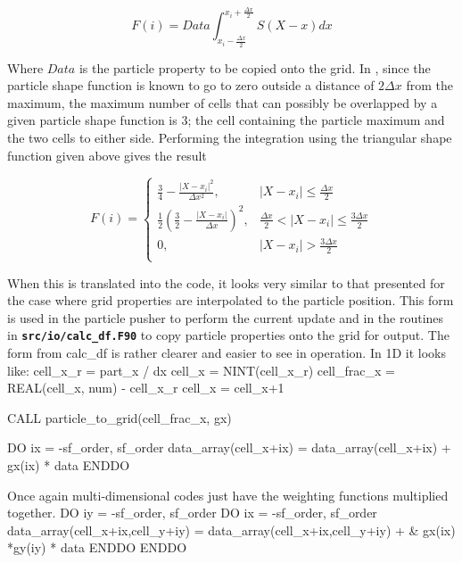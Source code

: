 \documentclass[12pt,a4paper]{article}
\newcommand{\inlinecode}[1]{{\color{warwickred} \bf\texttt{#1}}}
\newcommand{\EPOCH}{{\color{warwickdark}\fontfamily{phv}\selectfont{EPOCH}}}
\newenvironment{boxverbatim}{\lboxverbatim{none}}{\endlboxverbatim}
\begin{document}
\[
F(i) = Data  \int^{x_i+\frac{\Delta x}{2}}_{x_i-\frac{\Delta x}{2}} S(X-x) dx
\]

Where $Data$ is the particle property to be copied onto the grid. In {\EPOCH},
since the particle shape function is known to go to zero outside a distance of
$2 \Delta x$ from the maximum, the maximum number of cells that can possibly be
overlapped by a given particle shape function is 3; the cell containing the
particle maximum and the two cells to either side. Performing the integration
using the triangular shape function given above gives the result

\[
  F(i) =
\begin{cases}
  \frac{3}{4} - \frac{|X-x_i|^2}{\Delta x^2}, & |X-x_i|
    \le \frac{\Delta x}{2}\\
  \frac{1}{2} \left(\frac{3}{2}
    - \frac{|X - x_i|}{\Delta x} \right)^2, & \frac{\Delta x}{2} < |X-x_i|
    \le \frac{3 \Delta x}{2}\\
  0, & |X-x_i| > \frac{3 \Delta x}{2}\\
\end{cases}
\]


When this is translated into the code, it looks very similar to that presented
for the case where grid properties are interpolated to the particle
position. This form is used in the particle pusher to perform the current
update and in the routines in \inlinecode{src/io/calc\_df.F90} to copy particle
properties onto the grid for output. The form from calc\_df is rather clearer
and easier to see in operation. In 1D it looks like:
\begin{boxverbatim}
  cell_x_r = part_x / dx
  cell_x  = NINT(cell_x_r)
  cell_frac_x = REAL(cell_x, num) - cell_x_r
  cell_x = cell_x+1

  CALL particle_to_grid(cell_frac_x, gx)

  DO ix = -sf_order, sf_order
    data_array(cell_x+ix) = data_array(cell_x+ix) + gx(ix)  * data
  ENDDO
\end{boxverbatim}

Once again multi-dimensional codes just have the weighting functions multiplied
together.
\begin{boxverbatim}
  DO iy = -sf_order, sf_order
    DO ix = -sf_order, sf_order
      data_array(cell_x+ix,cell_y+iy) = data_array(cell_x+ix,cell_y+iy) + &
          gx(ix) *gy(iy) * data
    ENDDO
  ENDDO
\end{boxverbatim}
\end{document}

